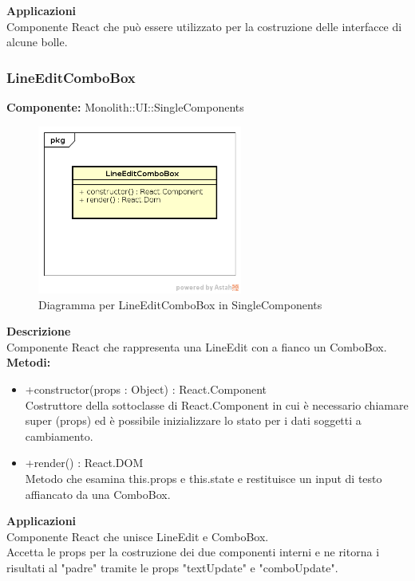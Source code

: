 \textbf{Applicazioni}\\
Componente React che può essere utilizzato per la costruzione delle interfacce di alcune bolle. 


\clearpage

\subsubsection{LineEditComboBox}
\textbf{Componente:}  Monolith::UI::SingleComponents\\
   \FloatBarrier
   \begin{figure}[ht]
   \centering
   \includegraphics[width=0.6\textwidth]{img/single-LineEditComboBox.png}
   \caption{{Diagramma per LineEditComboBox in SingleComponents}}
\end{figure}
\FloatBarrier
\textbf{Descrizione}\\
Componente React che rappresenta una LineEdit con a fianco un ComboBox. \\
\textbf{Metodi:} 
\begin{itemize}

\item +constructor(props : Object) : React.Component 
\\
Costruttore della sottoclasse di React.Component in cui è necessario chiamare super (props) ed è possibile inizializzare lo stato per i dati soggetti a cambiamento.

\item +render() : React.DOM 
\\
Metodo che esamina this.props e this.state e restituisce un input di testo affiancato da una ComboBox.

\end{itemize} 


\textbf{Applicazioni}\\
Componente React che unisce LineEdit e ComboBox.\\
Accetta le props per la costruzione dei due componenti interni e ne ritorna i risultati al "padre" tramite le props "textUpdate" e "comboUpdate". 


